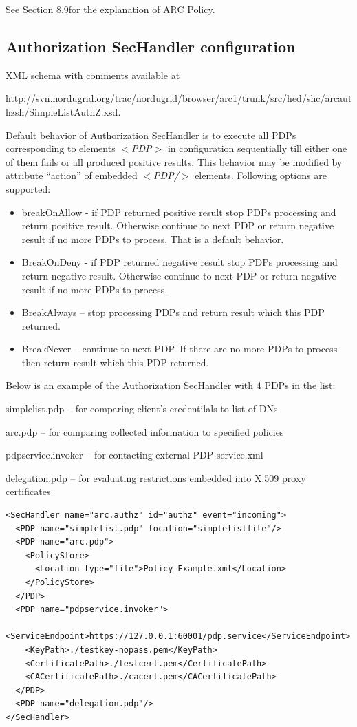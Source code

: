 \documentclass{article}                            %
\begin{document}
See Section 8.9for the explanation of ARC Policy.


\subsection{Authorization SecHandler configuration} %
\label{subsec:authzhandler_conf}
XML schema with comments available at 

http://svn.nordugrid.org/trac/nordugrid/browser/arc1/trunk/src/hed/shc/arcauthzsh/SimpleListAuthZ.xsd.

Default behavior of Authorization SecHandler is to execute all PDPs corresponding to elements \textit{$<$PDP$>$} in configuration sequentially till either one of them fails or all produced positive results. This behavior may be modified by attribute ``action'' of embedded \textit{$<$PDP/$>$} elements. Following options are supported:

    \begin{itemize}
        \item breakOnAllow - if PDP returned positive result stop PDPs processing and return positive result. Otherwise continue to next PDP or return negative result if no more PDPs to process. That is a default behavior.
        \item BreakOnDeny - if PDP returned negative result stop PDPs processing and return negative result. Otherwise continue to next PDP or return negative result if no more PDPs to process.
        \item BreakAlways – stop processing PDPs and return result which this PDP returned.
        \item BreakNever – continue to next PDP. If there are no more PDPs to process then return result which this PDP returned.
    \end{itemize}

Below is an example of the Authorization SecHandler with 4 PDPs in the list:

simplelist.pdp – for comparing client's credentilals to list of DNs

arc.pdp – for comparing collected information to specified policies

pdpservice.invoker – for contacting external PDP service.xml

delegation.pdp – for evaluating restrictions embedded into X.509 proxy certificates

\begin{verbatim}
<SecHandler name="arc.authz" id="authz" event="incoming">
  <PDP name="simplelist.pdp" location="simplelistfile"/>
  <PDP name="arc.pdp">
    <PolicyStore>
      <Location type="file">Policy_Example.xml</Location>
    </PolicyStore>
  </PDP>
  <PDP name="pdpservice.invoker">
    <ServiceEndpoint>https://127.0.0.1:60001/pdp.service</ServiceEndpoint>
    <KeyPath>./testkey-nopass.pem</KeyPath>
    <CertificatePath>./testcert.pem</CertificatePath>
    <CACertificatePath>./cacert.pem</CACertificatePath>
  </PDP>
  <PDP name="delegation.pdp"/>
</SecHandler>
\end{verbatim}
\end{document}
